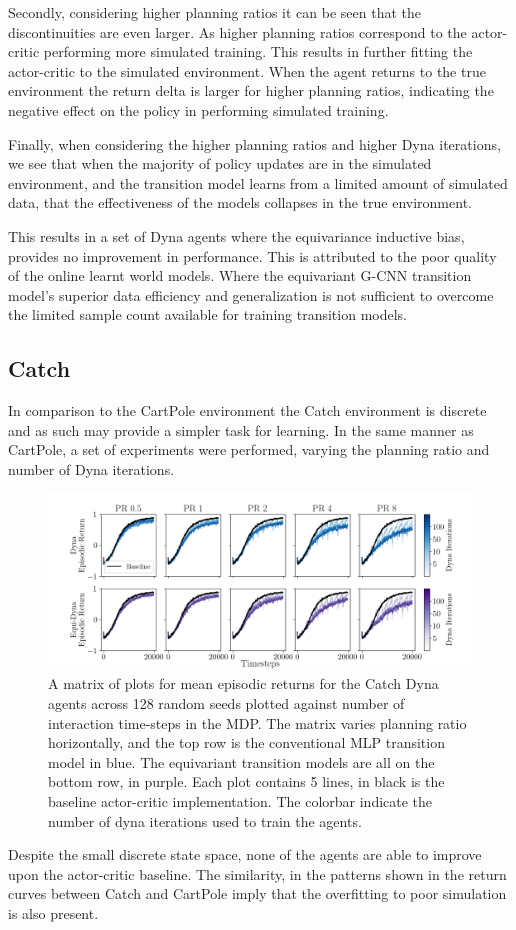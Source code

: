 Secondly, considering higher planning ratios it can be seen that the discontinuities are even larger. As higher planning ratios correspond to the actor-critic performing more simulated training. This results in further fitting the actor-critic to the simulated environment. When the agent returns to the true environment the return delta is larger for higher planning ratios, indicating the negative effect on the policy in performing simulated training.

Finally, when considering the higher planning ratios and higher Dyna iterations, we see that when the majority of policy updates are in the simulated environment, and the transition model learns from a limited amount of simulated data, that the effectiveness of the models collapses in the true environment.

This results in a set of Dyna agents where the equivariance inductive bias, provides no improvement in performance. This is attributed to the poor quality of the online learnt world models. Where the equivariant G-CNN transition model's superior data efficiency and generalization is not sufficient to overcome the limited sample count available for training transition models.

\subsection{Catch}
In comparison to the CartPole environment the Catch environment is discrete and as such may provide a simpler task for learning.
In the same manner as CartPole, a set of experiments were performed, varying the planning ratio and number of Dyna iterations.
\begin{figure}[h!]
	\centering
	\includegraphics[width=\textwidth]{Figures/dyna_sweep_catch.png}
	\caption{A matrix of plots for mean episodic returns for the Catch Dyna agents across 128 random seeds
		plotted against number of interaction time-steps in the MDP. The matrix varies planning ratio horizontally, and the top row is the conventional MLP transition model in blue. The equivariant transition models are all on the bottom row, in purple. Each plot contains 5 lines, in black is the baseline actor-critic implementation. The colorbar indicate the number of dyna iterations used to train the agents.}
	\label{fig:catch_dyna}
\end{figure}
Despite the small discrete state space, none of the agents are able to improve upon the actor-critic baseline. The similarity, in the patterns shown in the return curves between Catch and CartPole imply that the overfitting to poor simulation is also present.

